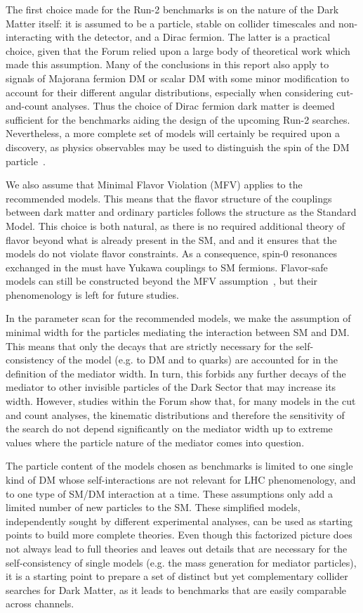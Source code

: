 The first choice made for the Run-2 benchmarks is on the nature of the
Dark Matter itself: it is assumed to be a particle, stable on collider
timescales and non-interacting with the detector, and a Dirac fermion.
The latter is a practical choice, given that the Forum relied upon a
large body of theoretical work which made this assumption. Many of the
conclusions in this report also apply to \MET{} signals of
Majorana fermion DM or scalar DM with some minor modification to
account for their different angular distributions, especially when
considering cut-and-count analyses. Thus the choice of Dirac fermion
dark matter is deemed sufficient for the benchmarks aiding the design
of the upcoming Run-2 searches. Nevertheless, a more complete set of
models will certainly be required upon a discovery, as physics observables
may be used to distinguish the spin of the DM particle~\cite{Crivellin:2015wva}. 

We also assume that Minimal Flavor Violation (MFV) applies to the
recommended models. This means that the flavor structure of the
couplings between dark matter and ordinary particles follows the
structure as the Standard Model. This choice is both natural, as there
is no required additional theory of flavor beyond what is already
present in the SM, and and it ensures that the
models do not violate flavor constraints.  As a consequence, spin-0
resonances exchanged in the \schannel must have Yukawa couplings to SM
fermions. Flavor-safe models can still be constructed beyond the MFV
assumption~\cite{Agrawal:2014aoa}, but their phenomenology is left for
future studies.

In the parameter scan for the recommended models, we make the
assumption of minimal width for the particles mediating the
interaction between SM and DM.  This means that only the decays that
are strictly necessary for the self-consistency of the model (e.g.  to
DM and to quarks) are accounted for in the definition of the mediator
width. In turn, this forbids any further decays of the mediator to other invisible
particles of the Dark Sector that may increase its width. However,
studies within the Forum show that, for many models in the cut and count analyses, the
kinematic distributions and therefore the sensitivity
of the search do not depend significantly on the mediator width up to
extreme values where the particle nature of the mediator comes into
question.

The particle content of the models chosen as benchmarks is limited to
one single kind of DM whose self-interactions are not relevant for LHC
phenomenology, and to one type of SM/DM interaction at a time. These
assumptions only add a limited number of new particles to the
SM. These simplified models, independently sought by different
experimental analyses, can be used as starting points to build more
complete theories. Even though this factorized picture does not always
lead to full theories and leaves out details that are necessary for
the self-consistency of single models (e.g. the mass generation for
mediator particles), it is a starting point to prepare a set of
distinct but yet complementary collider searches for Dark Matter, as
it leads to benchmarks that are easily comparable across channels.

